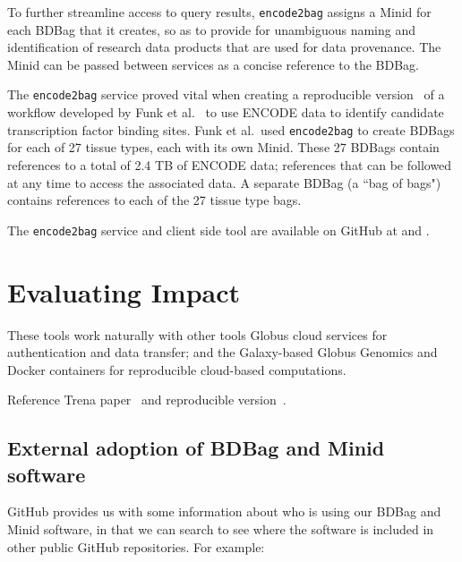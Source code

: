\documentclass[11pt]{article}
\begin{document}
To further streamline access to query results, \texttt{encode2bag} assigns a Minid for each BDBag that it creates,
so as to provide for unambiguous naming and identification of research data products that are used for data provenance.
The Minid can be passed between services as a concise reference to the BDBag.

The \texttt{encode2bag} service proved vital when creating a reproducible version~\cite{madduri2018reproducible}
of a workflow developed by Funk et al.~\cite{funk18} to use ENCODE data to identify candidate
transcription factor binding sites. 
Funk et al.\ used
 \texttt{encode2bag} to create BDBags for each of 27 tissue types, each with its own Minid.
These 27 BDBags contain references to a total of 2.4 TB of ENCODE data;
references that can be followed at any time to access the associated data.
A separate BDBag (a ``bag of bags") contains references to each of the 27 tissue type bags. 

The \texttt{encode2bag} service and client side tool are available on GitHub at
 and 
.



\section{Evaluating Impact}

These tools work naturally with other tools
Globus cloud services for authentication and data transfer; 
and the Galaxy-based Globus Genomics and Docker containers for reproducible cloud-based computations. 

Reference Trena paper~\cite{funk18} and reproducible version~\cite{madduri2018reproducible}.


\subsection{External adoption of BDBag and Minid software}

GitHub provides us with some information about who is using our BDBag and Minid software,
in that we can search to see where the software is included in other public GitHub repositories. 
For example:
\end{document}
